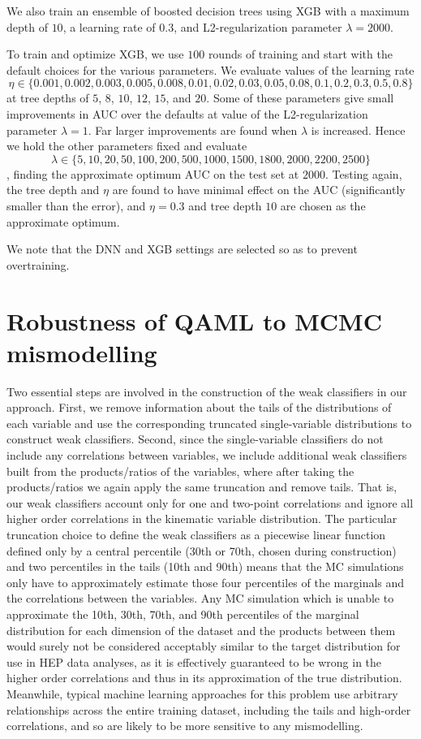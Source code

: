 \documentclass[.chapters/Higgs/.chapters/Higgs/main.tex]{subfiles}
\begin{document}
We  also train an ensemble of boosted decision trees using XGB \cite{xgboost}
with a maximum depth of $10$, a learning rate of $0.3$, and L2-regularization parameter $\lambda=2000$. 

To train and optimize XGB, we use $100$ rounds of training and start with the default choices for the various parameters. We  evaluate values of the learning rate $$\eta\in\{0.001,0.002,0.003,0.005,0.008,0.01,0.02,0.03,0.05,0.08,0.1,0.2,0.3,0.5,0.8\}$$
at tree depths of $5$, $8$, $10$, $12$, $15$, and $20$. Some of these parameters give small improvements in AUC over the defaults at value of the L2-regularization parameter $\lambda=1$. Far larger improvements are found when $\lambda$ is increased.  Hence  we hold the other parameters fixed and  evaluate $$\lambda\in\{5,10,20,50,100,200,500,1000,1500,1800,2000,2200,2500\}$$, finding the approximate optimum AUC on the test set at $2000$. Testing again, the tree depth and $\eta$ are  found to have minimal effect on the AUC (significantly smaller than the error), and $\eta=0.3$ and tree depth $10$ are  chosen as the approximate optimum. 

We note that the DNN and XGB settings are selected so as to prevent overtraining. 

\section*{Robustness of QAML to MCMC mismodelling}
Two essential steps are involved in the construction of the weak classifiers in our approach. First, we remove information about the tails of the distributions of each variable and use the corresponding truncated single-variable distributions to construct weak classifiers. Second, since the single-variable classifiers do not include any correlations between variables, we include additional weak classifiers built from the products/ratios of the variables, where after taking the products/ratios we again apply the same truncation and remove tails. That is, our weak classifiers account only for one and two-point correlations and ignore all higher order correlations in the kinematic variable distribution.
The particular truncation choice to define the weak classifiers as a piecewise linear function defined only by a central percentile (30th or 70th, chosen during construction) and two percentiles in the tails (10th and 90th) means that the MC simulations only have to approximately estimate those four percentiles of the marginals and the correlations between the variables. Any MC simulation which is unable to approximate the 10th, 30th, 70th, and 90th percentiles of the marginal distribution for each dimension of the dataset and the products between them would surely not be considered acceptably similar to the target distribution for use in HEP data analyses, as it is effectively guaranteed to be wrong in the higher order correlations and thus in its approximation of the true distribution. Meanwhile, typical machine learning approaches for this problem use arbitrary relationships across the entire training dataset, including the tails and high-order correlations, and so are likely to be more sensitive to any mismodelling.
\end{document}

